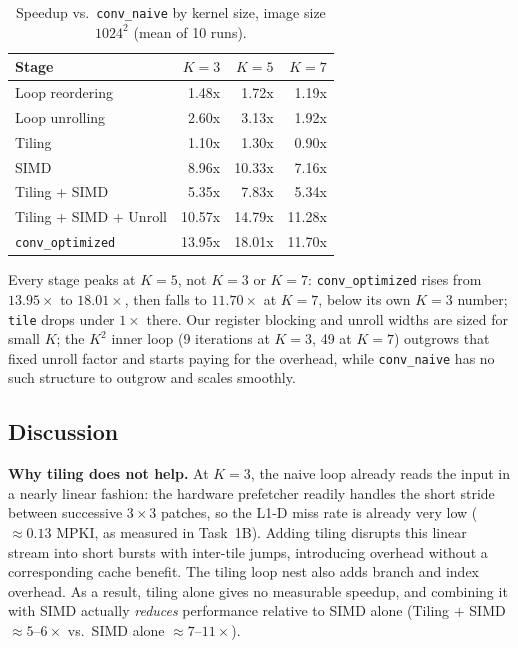 \documentclass[11pt]{article}
\begin{document}
\begin{table}[H]
    \centering
    \begin{tabular}{lrrr}
        \toprule
        \textbf{Stage} & \textbf{$K{=}3$} & \textbf{$K{=}5$} & \textbf{$K{=}7$} \\
        \midrule
        Loop reordering    & 1.48x & 1.72x & 1.19x \\
        Loop unrolling     & 2.60x & 3.13x & 1.92x \\
        Tiling             & 1.10x & 1.30x & 0.90x \\
        SIMD               & 8.96x & 10.33x & 7.16x \\
        Tiling + SIMD      & 5.35x & 7.83x & 5.34x \\
        Tiling + SIMD + Unroll & 10.57x & 14.79x & 11.28x \\
        \texttt{conv\_optimized} & 13.95x & 18.01x & 11.70x \\
        \bottomrule
    \end{tabular}
    \caption{Speedup vs.\ \texttt{conv\_naive} by kernel size, image size $1024^2$
    (mean of 10 runs).}
    \label{tab:all-opts-table-kernel}
\end{table}

Every stage peaks at $K=5$, not $K=3$ or $K=7$: \texttt{conv\_optimized} rises
from $13.95\times$ to $18.01\times$, then falls to $11.70\times$ at $K{=}7$,
below its own $K{=}3$ number; \texttt{tile} drops under $1\times$ there.
Our register blocking and unroll widths are sized for small $K$; the $K^2$
inner loop (9 iterations at $K{=}3$, 49 at $K{=}7$) outgrows that fixed
unroll factor and starts paying for the overhead, while
\texttt{conv\_naive} has no such structure to outgrow and scales smoothly.

\subsection{Discussion}

\textbf{Why tiling does not help.}
At $K=3$, the naive loop already reads the input in a nearly linear fashion:
the hardware prefetcher readily handles the short stride between successive
$3\times3$ patches, so the L1-D miss rate is already very low
($\approx 0.13$ MPKI, as measured in Task~1B). Adding tiling disrupts
this linear stream into short bursts with inter-tile jumps, introducing
overhead without a corresponding cache benefit. The tiling loop nest also
adds branch and index overhead. As a result, tiling alone gives no measurable
speedup, and combining it with SIMD actually \emph{reduces} performance
relative to SIMD alone (Tiling $+$ SIMD $\approx 5$--$6\times$ vs.\
SIMD alone $\approx 7$--$11\times$).
\end{document}

